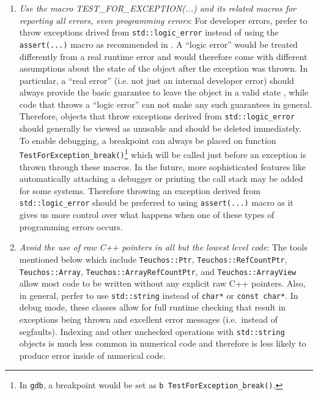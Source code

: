 \begin{enumerate}

{}\item\textit{Use the macro TEST\-\_FOR\-\_EXCEPTION(...) and its related
macros for reporting all errors, even programming errors}: For developer
errors, prefer to throw exceptions drived from
{}\texttt{std\-::logic\-\_error} instead of using the {}\texttt{assert(...)}
macro as recommended in {}\cite[Item 68]{C++CodingStandards05}.  A ``logic
error'' would be treated differently from a real runtime error and would
therefore come with different assumptions about the state of the object after
the exception was thrown.  In particular, a ``real error'' (i.e. not just an
internal developer error) should always provide the basic guarantee to leave
the object in a valid state {}\cite[Item 71]{C++CodingStandards05}, while code
that throws a ``logic error'' can not make any such guarantees in general.
Therefore, objects that throw exceptions derived from
{}\texttt{std\-::logic\-\_error} should generally be viewed as unusable and
should be deleted immediately.  To enable debugging, a breakpoint can always
be placed on function {}\texttt{Test\-For\-Exception\-\_break()}\footnote{In
{}\texttt{gdb}, a breakpoint would be set as {}\texttt{b
Test\-For\-Exception\-\_break()}.} which will be called just before an
exception is thrown through these macros.  In the future, more sophisticated
features like automatically attaching a debugger or printing the call stack
may be added for some systems.  Therefore throwing an exception derived from
{}\texttt{std\-::logic\-\_error} should be preferred to using
{}\texttt{assert(...)} macro as it gives us more control over what happens
when one of these types of programming errors occurs.

{}\item\textit{Avoid the use of raw C++ pointers in all but the lowest level
code}: The tools mentioned below which include {}\texttt{Teuchos::\-Ptr},
{}\texttt{Teuchos::\-Ref\-Count\-Ptr}, {}\texttt{Teuchos::\-Array},
{}\texttt{Teuchos::\-Array\-Ref\-Count\-Ptr}, and
{}\texttt{Teuchos::\-Array\-View} allow most code to be written without any
explicit raw C++ pointers.  Also, in general, perfer to use
{}\texttt{std\-::string} instead of {}\texttt{char*} or {}\texttt{const
char*}.  In debug mode, these classes allow for full runtime checking that
result in exceptions being thrown and excellent error messages (i.e.\ instead
of segfaults).  Indexing and other unchecked operations with
{}\texttt{std\-::string} objects is much less common in numerical code and
therefore is less likely to produce error inside of numerical code.


\end{enumerate}
